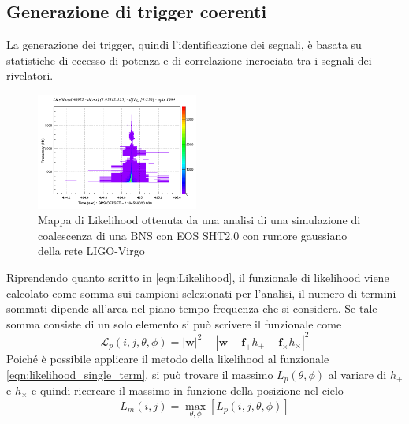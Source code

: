 \subsection{Generazione di trigger coerenti}
\label{section:coherent_trigger}

La generazione dei trigger, quindi l'identificazione dei segnali, è basata su statistiche di eccesso di potenza e di correlazione incrociata tra i segnali dei rivelatori. 

\begin{figure}
	\vspace{-25pt}
	\begin{center}
		\includegraphics[width=0.475\textwidth]{figures/Capitolo_2/l_tfmap_scalogram.png}
	\end{center}
	\vspace{-5pt}
	\caption{Mappa di Likelihood ottenuta da una analisi di una simulazione di coalescenza di una BNS con EOS SHT2.0 con rumore gaussiano della rete LIGO-Virgo}
	\label{fig:Likelihood_example}
	\vspace{-10pt}
\end{figure}
Riprendendo quanto scritto in \ref{eqn:Likelihood}, il funzionale di likelihood viene calcolato come somma sui campioni selezionati per l'analisi, il numero di termini sommati dipende all'area nel piano tempo-frequenza che si considera. Se tale somma consiste di un solo elemento si può scrivere il funzionale come
\begin{equation}
	\mathcal{L}_p(i,j,\theta,\phi)=|\mathbf{w}|^2 -|\mathbf{w} - \mathbf{f}_+h_+ - \mathbf{f}_\times h_\times|^2
	\label{eqn:likelihood_single_term}
\end{equation}
Poiché è possibile applicare il metodo della likelihood al funzionale \ref{eqn:likelihood_single_term}, si può trovare il massimo $L_p(\theta, \phi)$ al variare di $h_+$ e $h_\times$ e quindi ricercare il massimo in funzione della posizione nel cielo
\begin{equation}
	L_m(i,j)= \max_{\theta, \phi}[L_p(i,j,\theta,\phi)]
	\label{eqn:max_L}
\end{equation}
